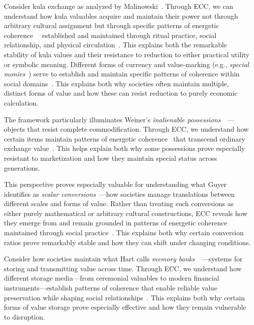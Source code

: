 Consider kula exchange as analyzed by Malinowski~\cite{malinowski1922argonauts}. Through ECC, we can understand how kula valuables acquire and maintain their power not through arbitrary cultural assignment but through specific patterns of energetic coherence~~ established and maintained through ritual practice, social relationship, and physical circulation~\cite{strathern2004partial}. This explains both the remarkable stability of kula values and their resistance to reduction to either practical utility or symbolic meaning. Different forms of currency and value-marking (e.g., \textit{special monies}~\cite{zelizer1994social}) serve to establish and maintain specific patterns of coherence within social domains~\cite{bohannan1959impact,appadurai1986social}. This explains both why societies often maintain multiple, distinct forms of value and how these can resist reduction to purely economic calculation.

The framework particularly illuminates Weiner's \textit{inalienable possessions}~~\cite{weiner1992inalienable}—objects that resist complete commodification. Through ECC, we understand how certain items maintain patterns of energetic coherence~ that transcend ordinary exchange value~\cite{nadasdy2007gift}. This helps explain both why some possessions prove especially resistant to marketization and how they maintain special status across generations.

This perspective proves especially valuable for understanding what Guyer identifies as \textit{scalar conversions}~\cite{guyer2004marginal}—how societies manage translations between different scales and forms of value. Rather than treating such conversions as either purely mathematical or arbitrary cultural constructions, ECC reveals how they emerge from and remain grounded in patterns of energetic coherence maintained through social practice~\cite{latour2005reassembling}. This explains both why certain conversion ratios prove remarkably stable and how they can shift under changing conditions.

Consider how societies maintain what Hart calls \textit{memory banks}~~\cite{hart2000memory}—systems for storing and transmitting value across time. Through ECC, we understand how different storage media—from ceremonial valuables to modern financial instruments—establish patterns of coherence that enable reliable value preservation while shaping social relationships~\cite{keane2003semiotics}. This explains both why certain forms of value storage prove especially effective and how they remain vulnerable to disruption.

